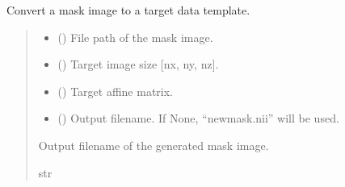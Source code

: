 \documentclass[letterpaper,10pt,english]{sphinxhowto}
\begin{document}
\begin{fulllineitems}
\label{\detokenize{stuff:neurora.stuff.mask_to}}
\pysigstartsignatures
{}
\pysigstopsignatures
\sphinxAtStartPar
Convert a mask image to a target data template.
\begin{quote}\begin{description}
\begin{itemize}
\item {} 
\sphinxAtStartPar
{} () \textendash{} File path of the mask image.

\item {} 
\sphinxAtStartPar
{} (\sphinxstyleliteralemphasis{\sphinxupquote{, }}) \textendash{} Target image size {[}nx, ny, nz{]}.

\item {} 
\sphinxAtStartPar
{} (\sphinxstyleliteralemphasis{\sphinxupquote{, }}\sphinxstyleliteralemphasis{\sphinxupquote{ {[}}}\sphinxstyleliteralemphasis{\sphinxupquote{, }}\sphinxstyleliteralemphasis{\sphinxupquote{{]}}}) \textendash{} Target affine matrix.

\item {} 
\sphinxAtStartPar
{} (\sphinxstyleliteralemphasis{\sphinxupquote{, }}) \textendash{} Output filename. If None, “newmask.nii” will be used.

\end{itemize}

\sphinxAtStartPar
{} \textendash{} Output filename of the generated mask image.

\sphinxAtStartPar
str

\end{description}\end{quote}

\end{fulllineitems}
\end{document}
